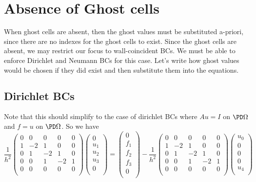 \documentclass[11pt]{article}
\begin{document}
\section{Absence of Ghost cells}
When ghost cells are absent, then the ghost values must be substituted a-priori, since there are no indexes for the ghost cells to exist. Since the ghost cells are absent, we may restrict our focus to wall-coincident BCs. We must be able to enforce Dirichlet and Neumann BCs for this case. Let's write how ghost values would be chosen if they did exist and then substitute them into the equations.

\subsection{Dirichlet BCs}
Note that this should simplify to the case of dirichlet BCs where $Au=I$ on $\PD \Omega$ and $f = u$ on $\PD \Omega$. So we have
\begin{equation}
\frac{1}{h^2}
 \begin{pmatrix}
  0 &  0 &  0 &  0 &  0 \\
  1 & -2 &  1 &  0 &  0 \\
  0 &  1 & -2 &  1 &  0 \\
  0 &  0 &  1 & -2 &  1 \\
  0 &  0 &  0 &  0 &  0 \\
 \end{pmatrix}
 \begin{pmatrix}
  0 \\  u_1 \\  u_2 \\  u_3 \\  0 \\
 \end{pmatrix}
  = 
 \begin{pmatrix}
  0 \\  f_1 \\  f_2 \\  f_3 \\  0 \\
 \end{pmatrix}
   -
\frac{1}{h^2}
 \begin{pmatrix}
  0 &  0 &  0 &  0 &  0 \\
  1 & -2 &  1 &  0 &  0 \\
  0 &  1 & -2 &  1 &  0 \\
  0 &  0 &  1 & -2 &  1 \\
  0 &  0 &  0 &  0 &  0 \\
 \end{pmatrix}
 \begin{pmatrix}
  u_0 \\  0 \\  0 \\  0 \\  u_4 \\
 \end{pmatrix}
\end{equation}
\end{document}
